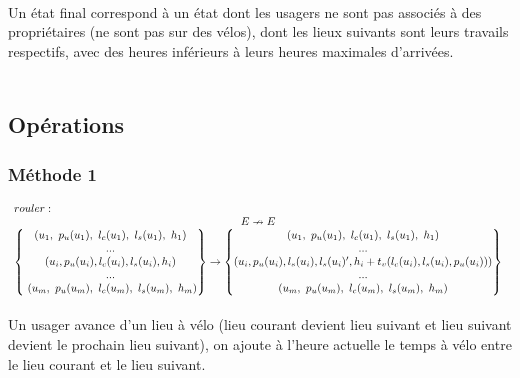 \documentclass[french]{article}
\begin{document}
\\
Un état final correspond à un état dont les usagers ne sont pas associés à des propriétaires (ne sont pas sur des vélos), dont les lieux suivants sont leurs travails respectifs, avec des heures inférieurs à leurs heures maximales d'arrivées.\\
\vspace*{0.5cm}
\\

\subsection{Opérations}
\subsubsection{Méthode 1}
\noindent
$\displaystyle  \begin{array}{{>{\displaystyle}l}}
rouler:\\
\begin{matrix}
E\nrightarrow E\\
\begin{Bmatrix}
( u_{1} ,\ p_{u}( u_{1}) ,\ l_{c}( u_{1}) ,\ l_{s}( u_{1}) ,\ h_{1})\\
...\\
( u_{i} ,p_{u}( u_{i}) ,l_{c}( u_{i}) ,l_{s}( u_{i}) ,h_{i})\\
...\\
\ ( u_{m} ,\ p_{u}( u_{m}) ,\ l_{c}( u_{m}) ,\ l_{s}( u_{m}) ,\ h_{m})
\end{Bmatrix}\rightarrow \begin{Bmatrix}
( u_{1} ,\ p_{u}( u_{1}) ,\ l_{c}( u_{1}) ,\ l_{s}( u_{1}) ,\ h_{1})\\
...\\
( u_{i} ,p_{u}( u_{i}) ,l_{s}( u_{i}) ,l_{s}( u_{i}) ',h_{i} +t_{v}( l_{c}( u_{i}) ,l_{s}( u_{i}),p_{u}( u_{i})))\\
...\\
( u_{m} ,\ p_{u}( u_{m}) ,\ l_{c}( u_{m}) ,\ l_{s}( u_{m}) ,\ h_{m})
\end{Bmatrix}
\end{matrix} \ 
\end{array}$\\
\\
Un usager avance d'un lieu à vélo (lieu courant devient lieu suivant et lieu suivant devient le prochain lieu suivant), on ajoute à l'heure actuelle le temps à vélo entre le lieu courant et le lieu suivant.
\vspace*{0.5cm}
\\
\end{document}
